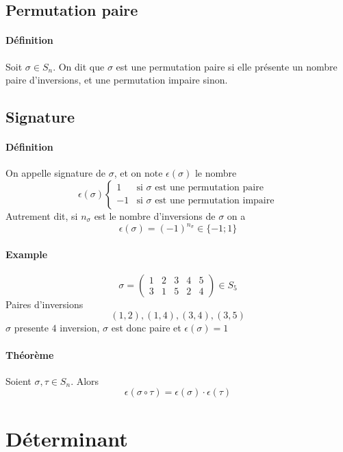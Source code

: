 %
\subsection{Permutation paire}
%
\paragraph{Définition} Soit $\sigma \in S_n$. On dit que $\sigma$ est une permutation paire si elle présente un nombre paire d'inversions, et une permutation impaire sinon.

%
\subsection{Signature}
%
\paragraph{Définition} On appelle signature de $\sigma$, et on note $\epsilon(\sigma)$ le nombre
$$\epsilon(\sigma) \left\{ \begin{array}{lr} 1 & \text{si } \sigma \text{ est une permutation paire} \\ -1 & \text{si } \sigma \text{ est une permutation impaire} \end{array}$$
Autrement dit, si $n_{\sigma}$ est le nombre d'inversions de $\sigma$ on a
$$\epsilon(\sigma) = (-1)^{n_{\sigma}} \in \{-1; 1\}$$

\paragraph{Example}
$$\sigma = \begin{pmatrix} 1 & 2 & 3 & 4 & 5 \\ 3 & 1 & 5 & 2 & 4 \end{pmatrix} \in S_5$$
Paires d'inversions
$$(1, 2), (1, 4), (3, 4), (3, 5)$$
$\sigma$ presente $4$ inversion, $\sigma$ est donc paire et $\epsilon(\sigma) = 1$

\paragraph{Théorème} Soient $\sigma, \tau \in S_n$. Alors
$$\epsilon(\sigma \circ \tau) = \epsilon(\sigma) \cdot \epsilon(\tau)$$

%
%
\section{Déterminant}
%
%

